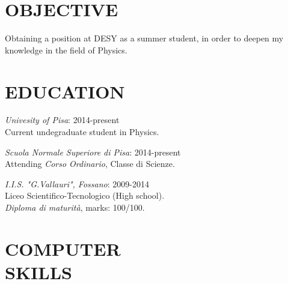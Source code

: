 \documentclass[margin, 10pt]{res} %
\begin{document}
\begin{resume}

 
\section{OBJECTIVE}  

Obtaining a position at DESY as a summer student, in order to deepen my knowledge in the field of Physics.


\section{EDUCATION}

{\sl Univesity of Pisa}:   \hfill 2014-present \\
Current undegraduate student in Physics.

{\sl Scuola Normale Superiore di Pisa}: \hfill 2014-present \\
Attending \textit{Corso Ordinario}, Classe di Scienze.

{\sl I.I.S. "G.Vallauri", Fossano}:  \hfill 2009-2014 \\
Liceo Scientifico-Tecnologico (High school).\\ 
\textit{Diploma di maturit\`a}, marks: 100/100.


 

\section{COMPUTER \\ SKILLS} 



\end{resume}
\end{document}
